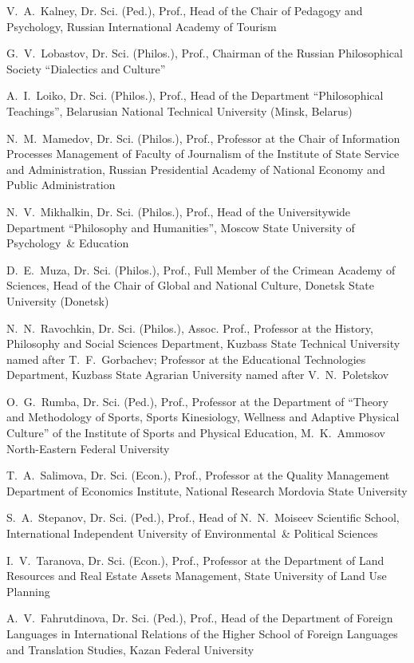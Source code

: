 \begin{otherlanguage}{english}
\begin{multicols}{2}
\noindent V. A. Kalney, Dr. Sci. (Ped.), Prof., Head of the Chair of Pedagogy and Psychology, Russian International Academy of Tourism

\noindent G. V. Lobastov, Dr. Sci. (Philos.), Prof., Chairman of the Russian Philosophical Society ``Dialectics and Culture''

\noindent A. I. Loiko, Dr. Sci. (Philos.), Prof., Head of the Department ``Philosophical Teachings'', Belarusian National Technical University (Minsk, Belarus)

\noindent N. M. Mamedov, Dr. Sci. (Philos.), Prof., Professor at the Chair of Information Processes Management of Faculty of Journalism of the Institute of State Service and Administration, Russian Presidential Academy of National Economy and Public Administration

\noindent N. V. Mikhalkin, Dr. Sci. (Philos.), Prof., Head of the Universitywide Department ``Philosophy and Humanities'', Moscow State University of Psychology \& Education

\noindent D. E. Muza, Dr. Sci. (Philos.), Prof., Full Member of the Crimean Academy of Sciences, Head of the Chair of Global and National Culture, Donetsk State University (Donetsk)

\noindent N. N. Ravochkin, Dr. Sci. (Philos.), Assoc. Prof., Professor at the History, Philosophy and Social Sciences Department, Kuzbass State Technical University named after T. F. Gorbachev; Professor at the Educational Technologies Department, Kuzbass State Agrarian University named after V. N. Poletskov

\noindent O. G. Rumba, Dr. Sci. (Ped.), Prof., Professor at the Department of ``Theory and Methodology of Sports, Sports Kinesiology, Wellness and Adaptive Physical Culture'' of the Institute of Sports and Physical Education, M. K. Ammosov North-Eastern Federal University

\noindent T. A. Salimova, Dr. Sci. (Econ.), Prof., Professor at the Quality Management Department of Economics Institute, National Research Mordovia State University

\noindent S. A. Stepanov, Dr. Sci. (Ped.), Prof., Head of N. N. Moiseev Scientific School, International Independent University of Environmental \& Political Sciences

\noindent I. V. Taranova, Dr. Sci. (Econ.), Prof., Professor at the Department of Land Resources and Real Estate Assets Management, State University of Land Use Planning

\noindent A. V. Fahrutdinova, Dr. Sci. (Ped.), Prof., Head of the Department of Foreign Languages in International Relations of the Higher School of Foreign Languages and Translation Studies, Kazan Federal University


\end{multicols}
\end{otherlanguage}
